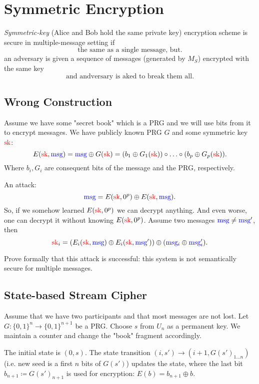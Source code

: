 

\section{Symmetric Encryption}


\begin{definition}
	\emph{Symmetric-key} (Alice and Bob hold the same private key) encryption scheme is secure in multiple-message setting if
	\[
		\text{the same as a single message, but}
	.\] an adversary is given a sequence of messages (generated by $M_S$) encrypted with the same key
	\[
		\text{and andversary is aked to break them all}
	.\] 
\end{definition}

\subsection{Wrong Construction}

Assume we have some "secret book" which is a PRG and we will use bits from it to encrypt messages.
We have publicly known PRG $G$ and some symmetric key  $\textcolor{red}{\text{sk}}$:
 \[
E(\textcolor{red}{\text{sk}}, \textcolor{blue}{\text{msg}}) = \textcolor{blue}{\text{msg}} \oplus G(\textcolor{red}{\text{sk}}) = (b_1 \oplus G_1(\textcolor{red}{\text{sk}})) \circ \ldots \circ (b_p \oplus G_p(\textcolor{red}{\text{sk}}))
.\] 
Where $b_i, G_i$ are consequent bits of the message and the PRG, respectively.

An attack:
 \[
	 \textcolor{blue}{\text{msg}} = E(\textcolor{red}{\text{sk}}, 0^{p}) \oplus E(\textcolor{red}{\text{sk}}, \textcolor{blue}{\text{msg}})
.\] 
So, if we somehow learned $E(\textcolor{red}{\text{sk}}, 0^{p})$ we can decrypt anything.
And even worse, one can decrypt it without knowing $E(\textcolor{red}{\text{sk}}, 0^{p})$.
Assume two messages $\textcolor{blue}{\text{msg}} \neq \textcolor{blue}{\text{msg}}'$, then
\[
\textcolor{red}{\text{sk}}_i = (E_i(\textcolor{red}{\text{sk}}, \textcolor{blue}{\text{msg}}) \oplus E_i(\textcolor{red}{\text{sk}}, \textcolor{blue}{\text{msg}}')) \oplus (\textcolor{blue}{\text{msg}}_i \oplus \textcolor{blue}{\text{msg}}'_i)
.\] 
\begin{exercise}
	Prove formally that this attack is successful: this system is not semantically secure for multiple messages.
\end{exercise}

\subsection{State-based Stream Cipher}

Assume that we have two participants and that most messages are not lost.
Let $G \colon \{0, 1\}^{n} \to  \{0, 1\}^{n + 1}$ be a PRG.
Choose $s$ from $U_n$ as a permanent key.
We maintain a counter and change the "book" fragment accordingly.

The initial state is $(0, s)$.
The state transition $(i, s') \to (i + 1, G(s')_{1\ldots n})$ (i.e. new seed is a first  $n$ bits of  $G(s')$) updates the state, where the last bit $b_{n + 1} \coloneqq G(s')_{n + 1}$ is used for encryption: $E(b) = b_{n + 1} \oplus b$.

